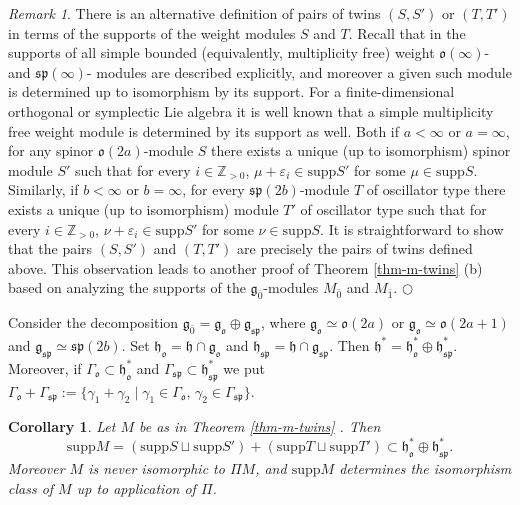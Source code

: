 \documentclass[12pt]{amsart}
\makeatletter
\def\@putname#1#2#3#4{\def\@@ref{#3}\let\old@bf\bf
        \def\bf##1{\old@bf\if?\noexpand##1?{#4}\else##1\fi}%
	#1{#2}%
        \let\bf\old@bf}
\def\@putname#1#2#3#4{\def\@@ref{#3}\let\old@bf\bf	%
	\let\old@reset@font\reset@font			%
        \def\bf##1{\old@bf\if?\noexpand##1?{#4}\else##1\fi}%
	\def\reset@font##1##2{\old@reset@font##1\if?\noexpand##2?{#4}\else##2\fi}#1{#2}%
        \let\bf\old@bf\let\reset@font\old@reset@font}
\let\my@ref=\ref
\def\ref#1{\@putname\my@ref{#1}{#1}{\tiny\rm\@@ref}}
\let\my@cite=\cite
\def\cite#1{\@putname\my@cite{#1}{\@citeb}{\tiny\rm\@@ref}}
\theoremstyle{plain} %
\numberwithin{equation}{section}
\theoremstyle{definition}
\theoremstyle{remark}
\newtheorem{remark}[definition]{Remark} %
\theoremstyle{plain} %
\newtheorem{corollary}[definition]{Corollary}
\renewcommand{\gg}{\mathfrak{g}}
\renewcommand{\sp}{\mathfrak{sp}}
\newcommand{\so}{\mathfrak{o}}
\newcommand{\supp}{\mathrm{supp}}
\newcommand{\Z}{\mathbb{Z}}
\newcommand{\gh}{\mathfrak{h}}
\def\gg{\mathfrak{g}}
\def\gh{\mathfrak{h}}
\makeatother
\begin{document}
	 \begin{remark}
There is an alternative definition of pairs of twins $(S,S')$ or $(T,T')$ in terms of the supports of the weight modules $S$ and $T$. Recall that in \cite{GrP} the supports of all simple bounded (equivalently, multiplicity free) weight $\so(\infty)$- and $\sp(\infty)$- modules are described explicitly, and moreover  a given such module is determined up to isomorphism by its support. For a finite-dimensional orthogonal or symplectic Lie algebra it is well known that a simple multiplicity free weight module is determined by its support as well. Both if $a< \infty$ or $a = \infty$, for any spinor $\so(2a)$-module $S$ there exists  a unique (up to isomorphism)  spinor module $S'$ such that for every $i \in \Z_{>0}$, 
$\mu + \varepsilon_i \in \supp S'$  for some $\mu \in \supp S$. Similarly, if $b< \infty$ or $b = \infty$, for every  $ \sp(2b)$-module $T$ of oscillator type there exists a unique (up to isomorphism) module $T'$ of oscillator type  such that for every $i \in \Z_{>0}$, $\nu + \varepsilon_i \in \supp S'$  for some $\nu \in \supp S$. It is straightforward to show that the pairs $(S,S')$ and $(T,T')$ are precisely the pairs of twins defined above. This observation leads to another proof of Theorem \ref{thm-m-twins}(b) based on analyzing the supports of the $\gg_{\bar{0}}$-modules $M_{\bar{0}}$ and $M_{\bar{1}}$. 
	 \hfill${\bigcirc}$    \end{remark}
	 
    Consider the decomposition $\gg_{\bar{0}} = \gg_{\mathfrak o}  \oplus \gg_{\sp} $, where $\gg_{\mathfrak o}  \simeq \so(2a)$ or $\gg_{\mathfrak o}  \simeq \so(2a+1)$ and  $\gg_{\sp}  \simeq \sp (2b)$. Set $\gh_{\so} = \gh \cap \gg_{\so}$ and  $\gh_{\sp} = \gh \cap \gg_{\sp}$. Then $\gh^* = \gh_{\so}^* \oplus \gh_{\sp}^*$. Moreover, if $\Gamma_{\so} \subset \gh_{\so}^*$  and $\Gamma_{\sp} \subset \gh_{\sp}^*$ we put  $\Gamma_{\so} + \Gamma_{\sp} := \{ \gamma_1 + \gamma_2 \; | \; \gamma_1 \in \Gamma_{\so}, \,  \gamma_2 \in \Gamma_{\sp}\}$.



\begin{corollary}
Let $M$ be as in Theorem \ref{thm-m-twins}. Then 
$$\supp M = \left( \supp S \sqcup \supp S' \right) + \left( \supp T \sqcup \supp T' \right) \subset \gh_{\so}^* \oplus \gh_{\sp}^*.$$ 
Moreover $M$ is never isomorphic to $\Pi M$, and $\supp M$ determines the isomorphism class of $M$ up to application of $\Pi$. 
\end{corollary}
\end{document}
